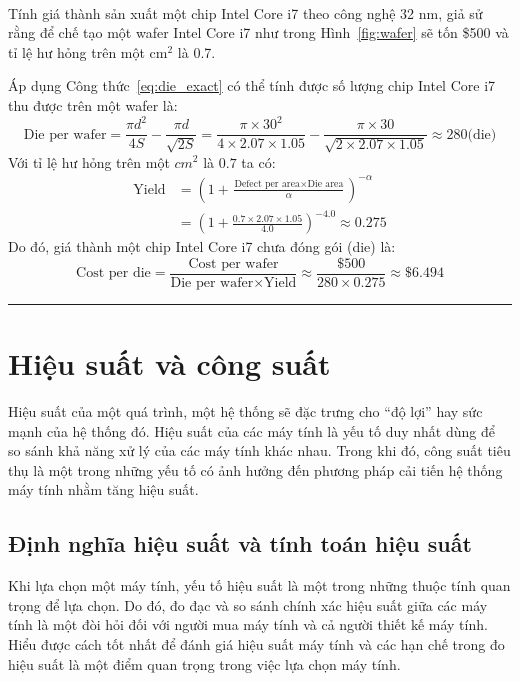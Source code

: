\begin{exmp}
\hrulefill\\
Tính giá thành sản xuất một chip Intel Core i7 theo công nghệ 32 nm, giả sử rằng để chế tạo một wafer Intel Core i7 như trong Hình~\ref{fig:wafer} sẽ tốn \$500 và tỉ lệ hư hỏng trên một cm$^2$ là 0.7.
\end{exmp}
\begin{answ}
Áp dụng Công thức~\ref{eq:die_exact} có thể tính được số lượng chip Intel Core i7 thu được trên một wafer là:
\begin{equation*}
\text{Die per wafer} = \frac{\pi d^2}{4S} - \frac{\pi d}{\sqrt{2S}} = \frac{\pi \times 30^2}{4 \times 2.07 \times 1.05} - \frac{\pi \times 30}{\sqrt{2 \times 2.07 \times 1.05}} \approx 280 \text{(die)}
\end{equation*}
Với tỉ lệ hư hỏng trên một $cm^2$ là $0.7$ ta có:
\begin{align*}
\text{Yield} &= (1 + \frac{\text{Defect per area} \times \text{Die area}}{\alpha})^{-\alpha} \\
	&= (1 + \frac{0.7 \times 2.07 \times 1.05}{4.0})^{-4.0} \approx 0.275
\end{align*}
Do đó, giá thành một chip Intel Core i7 chưa đóng gói (die) là:
\begin{equation*}
\text{Cost per die} = \frac{\text{Cost per wafer}}{\text{Die per wafer} \times\text{Yield}} \approx \frac{\$500}{280 \times 0.275} \approx \$6.494
\end{equation*}
\hrule
\end{answ}

\section{Hiệu suất và công suất}
Hiệu suất của một quá trình, một hệ thống sẽ đặc trưng cho ``độ lợi'' hay sức mạnh của hệ thống đó. Hiệu suất của các máy tính là yếu tố duy nhất dùng để so sánh khả năng xử lý của các máy tính khác nhau. Trong khi đó, công suất tiêu thụ là một trong những yếu tố có ảnh hưởng đến phương pháp cải tiến hệ thống máy tính nhằm tăng hiệu suất.

\subsection{Định nghĩa hiệu suất và tính toán hiệu suất}
\label{subsec:performance}
Khi lựa chọn một máy tính, yếu tố hiệu suất là một trong những thuộc tính quan trọng để lựa chọn. Do đó, đo đạc và so sánh chính xác hiệu suất giữa các máy tính là một đòi hỏi đối với người mua máy tính và cả người thiết kế máy tính. Hiểu được cách tốt nhất để đánh giá hiệu suất máy tính và các hạn chế trong đo hiệu suất là một điểm quan trọng trong việc lựa chọn máy tính.

